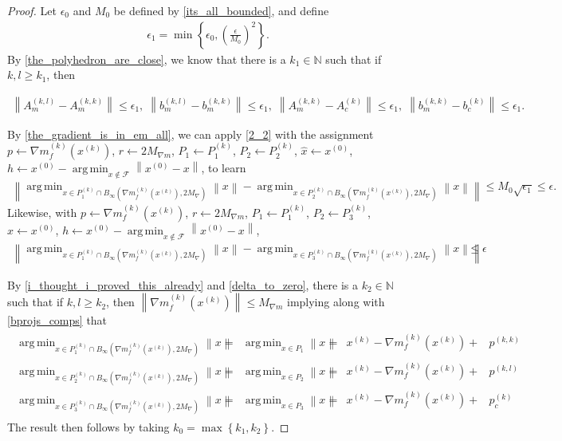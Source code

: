 \documentclass{article}
\theoremstyle{case}
\numberwithin{theorem}{subsection}
\DeclareMathOperator*{\argmin}{arg\,min}
\newcommand{\feasible}{{\mathcal F}}
\newcommand{\gk}{{\nabla m_f^{(k)}\left(\xk\right)}}
\newcommand{\maxgrad}{{M_{\nabla}}}
\newcommand{\naturals}{\mathbb N}
\newcommand{\xk}{x^{(k)}}
\newcommand{\xinit}{{x^{(0)}}}
\newcommand{\projkl}{{p^{(k,l)}}}
\newcommand{\projkk}{{p^{(k,k)}}}
\newcommand{\trueprojk}{{p_c^{(k)}}}
\newcommand{\maxmodelgrad}{{M_{\nabla m}}}
\begin{document}
\begin{proof}
Let $\epsilon_0$ and $M_0$ be defined by \cref{its_all_bounded},
and define
\begin{align*}
\epsilon_1 = \min\left\{ \epsilon_0, \left(\frac{\epsilon}{M_0}\right)^2\right\}.
\end{align*}
By \cref{the_polyhedron_are_close}, we know that there is a $k_1 \in \naturals$ such that if $k, l \ge k_1$, then

\begin{align*}
\left\|A_{m}^{(k, l)} - A_{m}^{(k, k)}\right\| \le \epsilon_1, \;
\left\|b_{m}^{(k, l)} - b_{m}^{(k, k)}\right\| \le \epsilon_1, \;
\left\|A_{m}^{(k, k)} - A_{c}^{(k)}\right\| \le \epsilon_1, \;
\left\|b_{m}^{(k, k)} - b_{c}^{(k)}\right\| \le \epsilon_1.
\end{align*}


By \cref{the_gradient_is_in_em_all}, we can apply \cref{2_2} with the assignment
$p \gets \gk$, $r \gets 2\maxmodelgrad$, $P_1 \gets P^{(k)}_1$, $P_2 \gets P^{(k)}_2$, $\hat x \gets \xinit$,
$h \gets \xinit - \argmin_{x \not \in \feasible} \left\|\xinit - x\right\|$,
to learn
\begin{align*}
\left\|
\argmin_{x \in P^{(k)}_1 \cap B_{\infty}\left(\gk, 2\maxgrad\right)} \left\|x\right\|
-
\argmin_{x \in P^{(k)}_2 \cap B_{\infty}\left(\gk, 2\maxgrad\right)} \left\|x\right\|
\right\|
\le M_0 \sqrt{\epsilon_1} \le \epsilon.
\end{align*}
Likewise, with
$p \gets \gk$, $r \gets 2\maxmodelgrad$, $P_1 \gets P^{(k)}_1$, $P_2 \gets P^{(k)}_3$, $\hat x \gets \xinit$,
$h \gets \xinit - \argmin_{x \not \in \feasible} \left\|\xinit - x\right\|$,
\begin{align*}
\left\|
\argmin_{x \in P^{(k)}_1 \cap B_{\infty}\left(\gk, 2\maxgrad\right)} \left\|x\right\|
-
\argmin_{x \in P^{(k)}_3 \cap B_{\infty}\left(\gk, 2\maxgrad\right)} \left\|x\right\|
\right\|
\le \epsilon
\end{align*}

By \cref{i_thought_i_proved_this_already} and \cref{delta_to_zero}, there is a $k_2 \in \naturals$ such that if $k, l \ge k_2$, then
$\left\|\gk\right\| \le \maxmodelgrad$
implying along with \cref{bprojs_comps} that
\begin{align*}
\begin{array}{cccccc}
\argmin_{x \in P^{(k)}_1 \cap B_{\infty}\left(\gk, 2\maxgrad\right)} \left\|x\right\|
&=& \argmin_{x \in P_1} \left\|x\right\| 
&=& \xk - \gk + &\projkk
\\
\argmin_{x \in P^{(k)}_2 \cap B_{\infty}\left(\gk, 2\maxgrad\right)} \left\|x\right\|
&=&\argmin_{x \in P_2} \left\|x\right\| 
&=& \xk - \gk + &\projkl
\\
\argmin_{x \in P^{(k)}_3 \cap B_{\infty}\left(\gk, 2\maxgrad\right)} \left\|x\right\|
&=& \argmin_{x \in P_3} \left\|x\right\| 
&=& \xk - \gk + &\trueprojk
\end{array}
\end{align*}
The result then follows by taking $k_0 = \max\left\{k_1, k_2\right\}$.
\end{proof}
\end{document}
